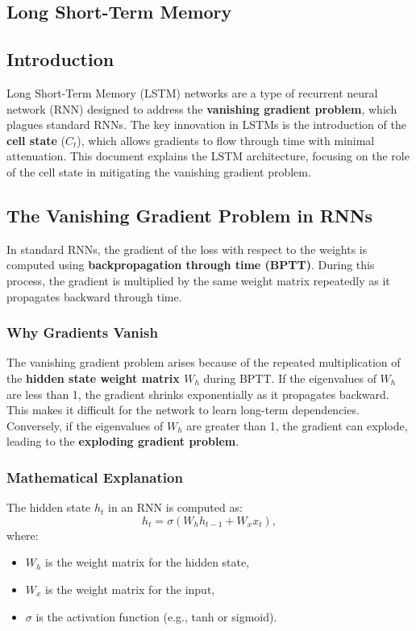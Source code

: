 \begin{notechapter}
\chapter{Long Short-Term Memory}\label{ch:lstm}

\section{Introduction}
Long Short-Term Memory (LSTM) networks are a type of recurrent
neural network (RNN) designed to address the \textbf{vanishing
gradient problem}, which plagues standard RNNs. The key innovation
in LSTMs is the introduction of the \textbf{cell state} (\(C_t\)),
which allows gradients to flow through time with minimal attenuation.
This document explains the LSTM architecture, focusing on the role
of the cell state in mitigating the vanishing gradient problem.

\section{The Vanishing Gradient Problem in RNNs}
In standard RNNs, the gradient of the loss with respect to the
weights is computed using \textbf{backpropagation through time (BPTT)}.
During this process, the gradient is multiplied by the same weight
matrix repeatedly as it propagates backward through time.

\subsection{Why Gradients Vanish}
The vanishing gradient problem arises because of the repeated
multiplication of the \textbf{hidden state weight matrix \(W_h\)}
during BPTT. If the eigenvalues of \(W_h\) are less than 1, the gradient
shrinks exponentially as it propagates backward. This makes it
difficult for the network to learn long-term dependencies. Conversely,
if the eigenvalues of \(W_h\) are greater than 1, the gradient can
explode, leading to the \textbf{exploding gradient problem}.

\subsection{Mathematical Explanation}
The hidden state \(h_t\) in an RNN is computed as:
\[
h_t = \sigma(W_h h_{t-1} + W_x x_t),
\]
where:
\begin{itemize}
    \item \(W_h\) is the weight matrix for the hidden state,
    \item \(W_x\) is the weight matrix for the input,
    \item \(\sigma\) is the activation function (e.g., tanh or sigmoid).
\end{itemize}


\end{notechapter}

